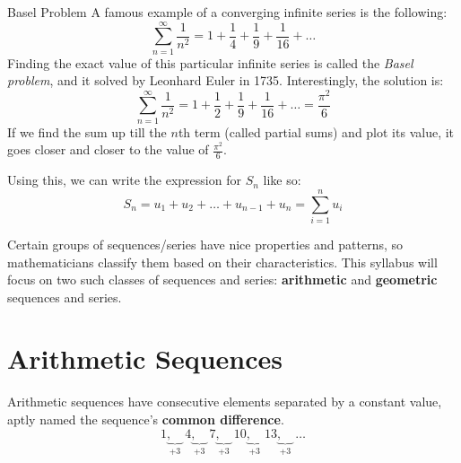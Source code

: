 \documentclass[../../main.tex]{subfiles}
\begin{document}
\begin{extension}{Basel Problem}
A famous example of a converging infinite series is the following:
\[
    \sum_{n=1}^{\infty}\frac1{n^2} = 1 + \frac14 + \frac19 + \frac1{16} + \ldots
\]
Finding the exact value of this particular infinite series is called the \emph{Basel problem}, and it solved by Leonhard Euler in 1735. Interestingly, the solution is:
\[
    \sum_{n=1}^{\infty}\frac1{n^2} = 1 + \frac12 + \frac19 + \frac1{16} + \ldots = \frac{\pi^2}{6}
\]
If we find the sum up till the $n$th term (called partial sums) and plot its value, it goes closer and closer to the value of $\frac{\pi^2}6$.\\
\end{extension}

Using this, we can write the expression for \(S_n\) like so:
\[
    S_n = u_1 + u_2 + \ldots + u_{n-1} + u_n = \sum_{i=1}^n u_i
\]

Certain groups of sequences/series have nice properties and patterns, so mathematicians classify them based on their characteristics. This syllabus will focus on two such classes of sequences and series: \textbf{arithmetic} and \textbf{geometric} sequences and series.

\section{Arithmetic Sequences}

Arithmetic sequences have consecutive elements separated by a constant value, aptly named the sequence's \textbf{common difference}.
\[
    1\underbrace{,\quad}_{+3}
    4\underbrace{,\quad}_{+3}
    7\underbrace{,\quad}_{+3}
    10\underbrace{,\quad}_{+3}
    13\underbrace{,\quad}_{+3}
    \ldots
\]
\end{document}
